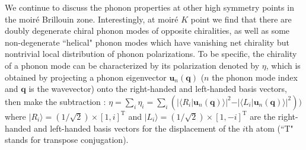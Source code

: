 \documentclass[aps,prl,twocolumn,amsmath,amssymb]{revtex4-2}
\begin{document}
We continue to discuss the phonon properties at other high symmetry points in the moir\'e Brillouin zone. Interestingly, at moir\'e $K$ point we find that there are doubly degenerate chiral phonon modes of opposite chiralities, as well as some non-degenerate ``helical" phonon modes which have vanishing net chirality but  nontrivial local distribution of phonon polarizations. 
To be specific, the chirality of a phonon mode can be characterized by its polarization denoted by $\eta$, which is obtained by projecting a phonon eigenvector $\mathbf{u}_{n}(\mathbf{q})$ ($n$ the phonon mode index and $\mathbf{q}$ is the wavevector) onto the right-handed and left-handed basis vectors, then make the subtraction \cite{zhanglf-chiralphonon-prl15}:
$\eta=\sum_{i} \eta_i=\sum_i(\vert\langle R_i\vert \mathbf{u}_n(\mathbf{q})\rangle\vert^2-\vert\langle L_i\vert \mathbf{u}_n(\mathbf{q})\rangle\vert^2))$
%
where $\vert R_i\rangle\!=\!(1/\sqrt{2})\times[1,i]^{\textrm{T}}$ and $\vert L_i\rangle\!=\!(1/\sqrt{2})\times[1,-i]^{\textrm{T}}$ are the right-handed and left-handed basis vectors for the displacement of the $i$th atom (``T" stands for transpose conjugation). 
\end{document}

